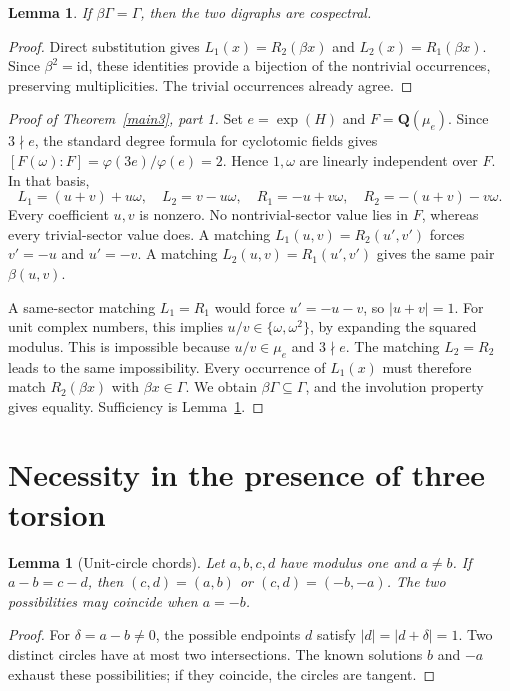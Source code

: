 \documentclass[11pt]{article}
\newtheorem{lemma}[theorem]{Lemma}
\theoremstyle{remark}\newtheorem{remark}[theorem]{Remark}
\newcommand{\Exp}{\operatorname{exp}}
\newcommand{\Q}{\mathbf Q}
\begin{document}
\begin{lemma}\label{betasuff}
If $\beta\Gamma=\Gamma$, then the two digraphs are cospectral.
\end{lemma}
\begin{proof}
Direct substitution gives $L_1(x)=R_2(\beta x)$ and $L_2(x)=R_1(\beta x)$. Since $\beta^2=\mathrm{id}$, these identities provide a bijection of the nontrivial occurrences, preserving multiplicities. The trivial occurrences already agree.
\end{proof}

\begin{proof}[Proof of Theorem~\ref{main3}, part 1]
Set $e=\Exp(H)$ and $F=\Q(\mu_e)$. Since $3\nmid e$, the standard degree formula for cyclotomic fields gives $[F(\omega):F]=\varphi(3e)/\varphi(e)=2$. Hence $1,\omega$ are linearly independent over $F$. In that basis,
\[
L_1=(u+v)+u\omega,\quad L_2=v-u\omega,\quad
R_1=-u+v\omega,\quad R_2=-(u+v)-v\omega.
\]
Every coefficient $u,v$ is nonzero. No nontrivial-sector value lies in $F$, whereas every trivial-sector value does. A matching $L_1(u,v)=R_2(u',v')$ forces $v'=-u$ and $u'=-v$. A matching $L_2(u,v)=R_1(u',v')$ gives the same pair $\beta(u,v)$.

A same-sector matching $L_1=R_1$ would force $u'=-u-v$, so $|u+v|=1$. For unit complex numbers, this implies $u/v\in\{\omega,\omega^2\}$, by expanding the squared modulus. This is impossible because $u/v\in\mu_e$ and $3\nmid e$. The matching $L_2=R_2$ leads to the same impossibility. Every occurrence of $L_1(x)$ must therefore match $R_2(\beta x)$ with $\beta x\in\Gamma$. We obtain $\beta\Gamma\subseteq\Gamma$, and the involution property gives equality. Sufficiency is Lemma~\ref{betasuff}.
\end{proof}

\section{Necessity in the presence of three torsion}
\begin{lemma}[Unit-circle chords]\label{chord}
Let $a,b,c,d$ have modulus one and $a\ne b$. If $a-b=c-d$, then $(c,d)=(a,b)$ or $(c,d)=(-b,-a)$. The two possibilities may coincide when $a=-b$.
\end{lemma}
\begin{proof}
For $\delta=a-b\ne0$, the possible endpoints $d$ satisfy $|d|=|d+\delta|=1$. Two distinct circles have at most two intersections. The known solutions $b$ and $-a$ exhaust these possibilities; if they coincide, the circles are tangent.
\end{proof}
\end{document}
